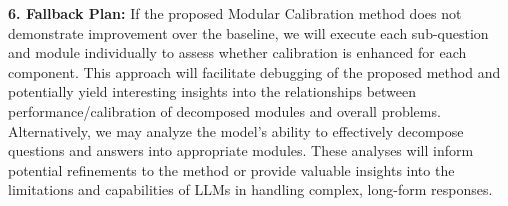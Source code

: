 \begin{tcolorbox}[colback=blue!5!white,colframe=blue!75!black,title=\textbf{Modular Calibration for Long-form Answers (Part 2)}]
    \textbf{6. Fallback Plan:} If the proposed Modular Calibration method does not demonstrate improvement over the baseline, we will execute each sub-question and module individually to assess whether calibration is enhanced for each component. This approach will facilitate debugging of the proposed method and potentially yield interesting insights into the relationships between performance/calibration of decomposed modules and overall problems. Alternatively, we may analyze the model's ability to effectively decompose questions and answers into appropriate modules. These analyses will inform potential refinements to the method or provide valuable insights into the limitations and capabilities of LLMs in handling complex, long-form responses.

\end{tcolorbox}


\newpage 




